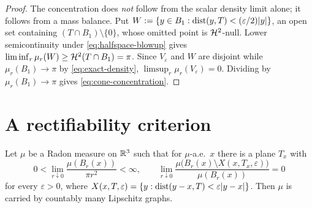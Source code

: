 \begin{proof}
The concentration does \emph{not} follow from the scalar density limit alone;
it follows from a mass balance.  Put
$W:=\{y\in B_1:\operatorname{dist}(y,T)<(\varepsilon/2)|y|\}$, an open set containing
$(T\cap B_1)\setminus\{0\}$, whose omitted point is $\mathcal H^2$-null.  Lower
semicontinuity under \eqref{eq:halfspace-blowup} gives
$\liminf_r\mu_r(W)\ge\mathcal H^2(T\cap B_1)=\pi$.  Since $V_\varepsilon$ and $W$
are disjoint while $\mu_r(B_1)\to\pi$ by
\eqref{eq:exact-density}, $\limsup_r\mu_r(V_\varepsilon)=0$.  Dividing by
$\mu_r(B_1)\to\pi$ gives \eqref{eq:cone-concentration}.
\end{proof}

\section{A rectifiability criterion}

\begin{lemma}
\label{lem:rectifiability-criterion}
Let $\mu$ be a Radon measure on $\mathbb R^3$ such that for $\mu$-a.e.\ $x$ there is
a plane $T_x$ with
\begin{equation}\label{eq:rect-hyp}
  0<\lim_{r\downarrow0}\frac{\mu(B_r(x))}{\pi r^2}<\infty,
  \qquad
  \lim_{r\downarrow0}
    \frac{\mu\bigl(B_r(x)\setminus X(x,T_x,\varepsilon)\bigr)}{\mu(B_r(x))}=0
\end{equation}
for every $\varepsilon>0$, where
$X(x,T,\varepsilon)=\{y:\operatorname{dist}(y-x,T)<\varepsilon|y-x|\}$.  Then $\mu$ is
carried by countably many Lipschitz graphs.
\end{lemma}


